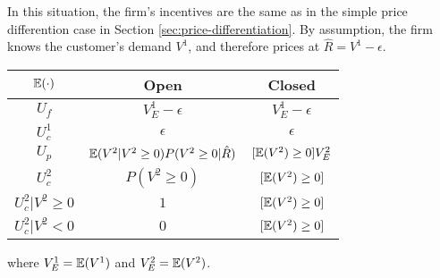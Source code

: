 \documentclass[../thesis.tex]{subfiles}
\begin{document}
In this situation, the firm's incentives are the same
as in the simple price differention
case in Section \ref{sec:price-differentiation}.
By assumption, the firm knows the customer's demand
$V^1$, and therefore prices at $\hat{R} = V^1 - \epsilon$.

\begin{center}
\begin{tabular}{ |c|c|c| } 
 \hline
  $\mathbb{E}(\cdot)$ & Open & Closed  \\
 \hline
 $U_f$ & $V^1_E - \epsilon$ & $V^1_E - \epsilon$ \\
 $U^1_c$ & $\epsilon$ & $\epsilon$ \\
 $U_p$ & $\mathbb{E}(V^2 \vert V^2 \geq 0) P(V^2 \geq 0 \vert \hat{R})$ & $[\mathbb{E}(V^2) \geq 0] V^2_E$  \\
 $U_c^2$ & $P(V^2 \geq 0)$ & $[\mathbb{E}(V^2) \geq 0]$  \\
 $U_c^2 \vert V^2 \geq 0$ & $1$ & $[\mathbb{E}(V^2) \geq 0]$  \\
 $U_c^2 \vert V^2 < 0$ & $0$ & $[\mathbb{E}(V^2) \geq 0]$  \\
 \hline
\end{tabular}
\end{center}

where $V^1_E = \mathbb{E}(V^1)$ and $V^2_E = \mathbb{E}(V^2)$.
\end{document}
